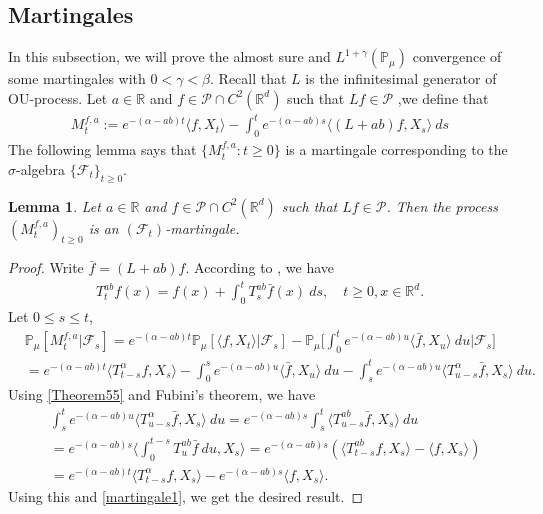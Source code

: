 \documentclass[12pt,oneside,english]{amsart}
\theoremstyle{plain}
\newtheorem{lem}[thm]{Lemma}
\theoremstyle{definition}
\numberwithin{equation}{section}
\begin{document}
\subsection{Martingales}
    In this subsection, we will prove the almost sure and $L^{1+\gamma}(\mathbb{P}_{\mu})$ convergence of some martingales with $0<\gamma<\beta$. Recall that $L$ is the infinitesimal generator of OU-process. Let $a\in \mathbb{R}$ and $f\in \mathcal{P}\cap C^2(\mathbb{R}^d)$ such that $Lf \in \mathcal{P}$ ,we define that
\begin{align}
\label{defmartingale}
    M_t^{f,a}:=e^{-(\alpha-ab)t}\langle f,X_t\rangle-\int_0^t e^{-(\alpha-ab)s}\langle (L+ab)f, X_s\rangle~ ds
\end{align}
    The following lemma says that $\{M_t^{f,a}: t\geq 0\}$ is a martingale corresponding to the $\sigma$-algebra $\{\mathcal{F}_t\}_{t\geq 0}$.
\begin{lem}
\label{lemma25}
    Let $a\in \mathbb R$ and $f\in \mathcal{P}\cap C^2(\mathbb{R}^d)$ such that $Lf \in \mathcal{P}$. Then the process $(M_t^{f,a})_{t\geq 0}$ is an $(\mathscr F_t)$-martingale.
\end{lem}
\begin{proof}
    Write $\bar{f}=(L+ab)f$. According to \cite[Theorem A.55]{Li2011Measure-valued}, we have
\begin{align}\label{Theorem55}
    T_t^{ab}f(x)= f(x)+\int_0^t T_s^{ab}\bar{f}(x)~ds,\quad t\geq 0,x\in \mathbb{R}^d.
\end{align}
Let $0\leq s\leq t$,
\begin{align}
\label{martingale1}
    &\mathbb{P}_{\mu}[M_t^{f,a}|\mathcal{F}_s]
    =e^{-(\alpha-ab)t}\mathbb{P}_{\mu}\left[\langle f,X_t\rangle|\mathcal{F}_s\right]-\mathbb{P}_{\mu}\Big[\int_0^t e^{-(\alpha-ab)u}\langle \bar{f}, X_u\rangle~ du\Big|\mathcal{F}_s\big]
    \\&=e^{-(\alpha-ab)t}\langle T_{t-s}^{\alpha}f, X_s\rangle-\int_0^s e^{-(\alpha-ab)u}\langle \bar{f}, X_u\rangle~ du -\int_s^t e^{-(\alpha-ab)u}\langle T_{u-s}^{\alpha} \bar{f},X_s\rangle~ du.
\end{align}
    Using \eqref{Theorem55} and Fubini's theorem, we have
\begin{align}
    &\int_s^t e^{-(\alpha-ab)u}\langle T_{u-s}^{\alpha} \bar{f},X_s\rangle~ du=e^{-(\alpha-ab)s}\int_s^t\langle T_{u-s}^{ab}\bar{f},X_s\rangle~du\\
    &=e^{-(\alpha-ab)s}\langle\int_0^{t-s}T_{u}^{ab}\bar{f}~du,X_s\rangle=e^{-(\alpha-ab)s}\left(\langle T_{t-s}^{ab}f,X_s\rangle-\langle
    f,X_s\rangle\right)\\
    &=e^{-(\alpha-ab)t}\langle T_{t-s}^{\alpha}f, X_s\rangle-e^{-(\alpha-ab)s}\langle
    f,X_s\rangle.
\end{align}
   Using this and \eqref{martingale1}, we get the desired result.
\end{proof}
\end{document}
